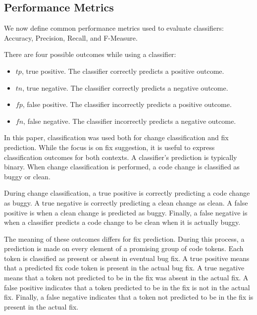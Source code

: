 \documentclass[journal,10pt,draftclsnofoot,twocolumn]{IEEEtran}
\begin{document}
\subsection{Performance Metrics}
\label{section:PerformanceMetrics}


\par We now define common performance metrics used to evaluate classifiers:
Accuracy, Precision, Recall, and F-Measure.

There are four possible outcomes while using a classifier:
\begin{itemize}
  \item $tp$, true positive. The classifier correctly predicts a positive outcome.
  \item $tn$, true negative. The classifier correctly predicts a negative outcome.
  \item $fp$, false positive. The classifier incorrectly predicts a positive outcome.
  \item $fn$, false negative. The classifier incorrectly predicts a negative outcome.
\end{itemize}

In this paper, classification was used both for change classification and fix prediction. While the focus is on fix suggestion, 
it is useful to express classification outcomes for both contexts. A classifier's prediction is typically binary. When change classification is performed, a code change is classified as buggy or clean.

During change classification, a true positive is correctly predicting a code change as buggy. A true negative is correctly predicting a clean change as clean. 
A false positive is when a clean change is predicted as buggy. Finally, a false negative is when a classifier predicts a code change to be clean when it is actually buggy. 

The meaning of these outcomes differs for fix prediction. During this process, a prediction is made on every element of a promising group of code tokens. Each token is classified as present or absent in eventual bug fix. A true positive means that a predicted fix code token is present in the actual bug fix. A true negative means that a token not predicted to be in the fix was absent in the actual fix. 
A false positive indicates that a token predicted to be in the fix is not in the actual fix. Finally, a false negative indicates that a token not predicted to be in the fix is present in the actual fix.

%
\end{document}
